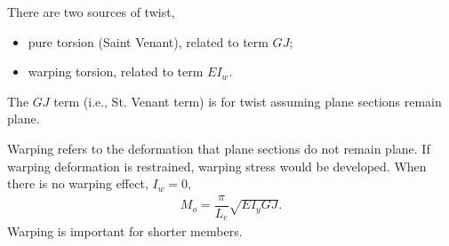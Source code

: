 There are two sources of twist,
\begin{itemize}
\item pure torsion (Saint Venant), related to term $GJ$;
\item warping torsion, related to term $EI_w$.
\end{itemize}

The $GJ$ term (i.e., St. Venant term) is for twist assuming plane sections remain plane.
\begin{figure}[H]
\centering

\end{figure}

Warping refers to the deformation that plane sections do not remain plane. If warping deformation is restrained, warping stress would be developed. When there is no warping effect, $I_w=0$,
\begin{gather}\label{eq:no_warp}
M_o=\dfrac{\pi}{L_e}\sqrt{EI_yGJ}.
\end{gather}
Warping is important for shorter members.

